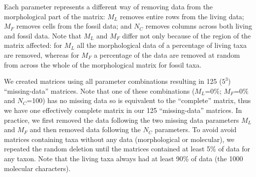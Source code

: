 Each parameter represents a different way of removing data from the morphological part of the matrix: $M_L$ removes entire rows from the living data; $M_F$ removes cells from the fossil data; and $N_C$ removes columns across both living and fossil data.
Note that $M_L$ and $M_F$ differ not only because of the region of the matrix affected: for $M_L$ all the morphological data of a percentage of living taxa are removed, whereas for $M_F$ a percentage of the data are removed at random from across the whole of the morphological matrix for fossil taxa.

We created matrices using all parameter combinations resulting in 125 ($5^3$) ``missing-data'' matrices.
Note that one of these combinations ($M_L$=0\%; $M_F$=0\% and $N_C$=100) has no missing data so is equivalent to the ``complete'' matrix, thus we have one effectively complete matrix in our 125 ``missing-data'' matrices.
In practice, we first removed the data following the two missing data parameters $M_L$ and $M_F$ and then removed data following the $N_C$ parameters.
To avoid avoid matrices containing taxa without any data (morphological or molecular), we repeated the random deletion until the matrices contained at least 5\% of data for any taxon.
Note that the living taxa always had at least 90\% of data (the 1000 molecular characters).


